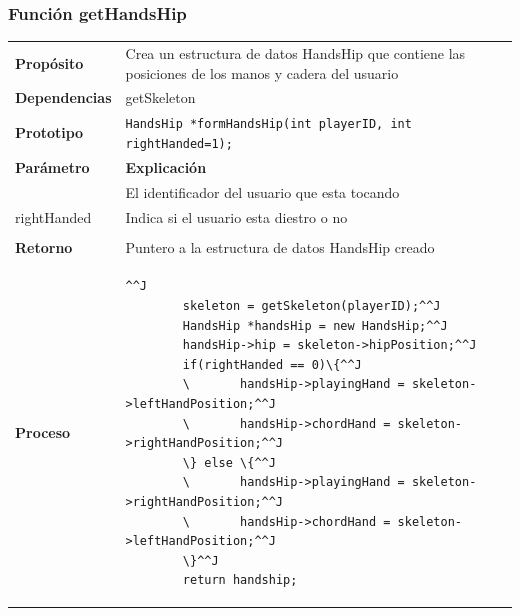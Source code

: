 \documentclass[a4paper,12pt]{article}
\begin{document}
\subsubsection{Función getHandsHip}
\begin{tabularx}{\textwidth}{p{25mm} X}
        \textbf{Propósito} & Crea un estructura de datos HandsHip que contiene
        las posiciones de los manos y cadera del usuario\\
        \textbf{Dependencias} & getSkeleton\\
        \textbf{Prototipo} & \lstinline{HandsHip *formHandsHip(int playerID, int rightHanded=1);}\\
        \textbf{Parámetro} & \textbf{Explicación} \\
        \begin{tabular}{p{2cm} l}
                playerID & El identificador del usuario que esta tocando \\
                rightHanded & Indica si el usuario esta diestro o no \\
        \end{tabular} \\

        \textbf{Retorno} & Puntero a la estructura de datos HandsHip creado\\
        \textbf{Proceso} & 
        \begin{lstlisting}[breaklines=true]^^J
        skeleton = getSkeleton(playerID);^^J
        HandsHip *handsHip = new HandsHip;^^J
        handsHip->hip = skeleton->hipPosition;^^J
        if(rightHanded == 0)\{^^J
        \       handsHip->playingHand = skeleton->leftHandPosition;^^J
        \       handsHip->chordHand = skeleton->rightHandPosition;^^J
        \} else \{^^J
        \       handsHip->playingHand = skeleton->rightHandPosition;^^J
        \       handsHip->chordHand = skeleton->leftHandPosition;^^J
        \}^^J
        return handship;
        \end{lstlisting} \\
\end{tabularx}
\end{document}
